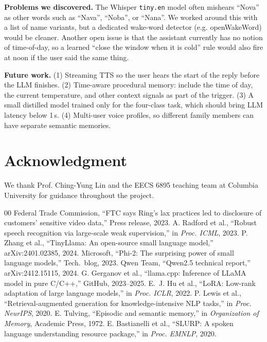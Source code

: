 \documentclass[conference]{IEEEtran}
\begin{document}
\textbf{Problems we discovered.} The Whisper \texttt{tiny.en} model often mishears ``Nova'' as other words such as ``Nava'', ``Noba'', or ``Nana''. We worked around this with a list of name variants, but a dedicated wake-word detector (e.g. openWakeWord) would be cleaner. Another open issue is that the assistant currently has no notion of time-of-day, so a learned ``close the window when it is cold'' rule would also fire at noon if the user said the same thing.

\textbf{Future work.} (1) Streaming TTS so the user hears the start of the reply before the LLM finishes. (2) Time-aware procedural memory: include the time of day, the current temperature, and other context signals as part of the trigger. (3) A small distilled model trained only for the four-class task, which should bring LLM latency below 1\,s. (4) Multi-user voice profiles, so different family members can have separate semantic memories.

\section*{Acknowledgment}

We thank Prof. Ching-Yung Lin and the EECS 6895 teaching team at Columbia University for guidance throughout the project.

\begin{thebibliography}{00}
 Federal Trade Commission, ``FTC says Ring's lax practices led to disclosure of customers' sensitive video data,'' Press release, 2023.
 A. Radford et al., ``Robust speech recognition via large-scale weak supervision,'' in \emph{Proc. ICML}, 2023.
 P. Zhang et al., ``TinyLlama: An open-source small language model,'' arXiv:2401.02385, 2024.
 Microsoft, ``Phi-2: The surprising power of small language models,'' Tech.\ blog, 2023.
 Qwen Team, ``Qwen2.5 technical report,'' arXiv:2412.15115, 2024.
 G. Gerganov et al., ``llama.cpp: Inference of LLaMA model in pure C/C++,'' GitHub, 2023--2025.
 E.~J. Hu et al., ``LoRA: Low-rank adaptation of large language models,'' in \emph{Proc. ICLR}, 2022.
 P. Lewis et al., ``Retrieval-augmented generation for knowledge-intensive NLP tasks,'' in \emph{Proc. NeurIPS}, 2020.
 E. Tulving, ``Episodic and semantic memory,'' in \emph{Organization of Memory}, Academic Press, 1972.
 E. Bastianelli et al., ``SLURP: A spoken language understanding resource package,'' in \emph{Proc. EMNLP}, 2020.
\end{thebibliography}
\end{document}
